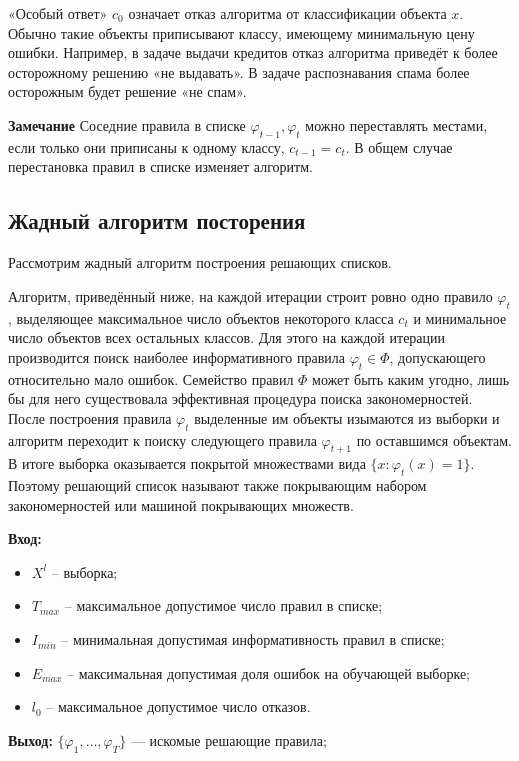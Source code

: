 «Особый ответ» $c_0$ означает отказ алгоритма от классификации объекта $x$.
Обычно такие объекты приписывают классу, имеющему минимальную цену ошибки.
Например, в задаче выдачи кредитов отказ алгоритма приведёт к более осторожному решению «не выдавать». В задаче распознавания спама более осторожным будет
решение «не спам».

\textbf{Замечание} Соседние правила в списке $\varphi_{t-1}, \varphi_t$ можно переставлять местами,
если только они приписаны к одному классу, $c_{t-1} = c_t$. В общем случае перестановка
правил в списке изменяет алгоритм.

\subsection{Жадный алгоритм посторения}
Рассмотрим жадный алгоритм построения решающих списков.

Алгоритм, приведённый ниже, на каждой итерации строит ровно одно правило $\varphi_t$, выделяющее максимальное число объектов некоторого класса $c_t$ и минимальное число объектов
всех остальных классов. Для этого на каждой итерации производится поиск наиболее информативного правила $\varphi_t \in \Phi$, допускающего относительно мало ошибок. Семейство
правил $\Phi$ может быть каким угодно, лишь бы для него существовала эффективная
процедура поиска закономерностей. После построения правила $\varphi_t$ выделенные им объекты изымаются из выборки и алгоритм переходит к поиску следующего правила $\varphi_{t+1}$ по оставшимся объектам. В итоге выборка оказывается покрытой
множествами вида $\{x: \varphi_t(x) = 1\}$. Поэтому решающий список называют также покрывающим набором закономерностей или машиной покрывающих множеств.

\textbf{Вход:}
\begin{itemize}
    \item $X^l$ -- выборка;
    \item $T_{max}$ -- максимальное допустимое число правил в списке;
    \item $I_{min}$ -- минимальная допустимая информативность правил в списке;
    \item $E_{max}$ -- максимальная допустимая доля ошибок на обучающей выборке;
    \item $l_0$ -- максимальное допустимое число отказов.
\end{itemize}

\textbf{Выход:}
$\{\varphi_1, \dots, \varphi_T\} \text{ — искомые решающие правила;}$

